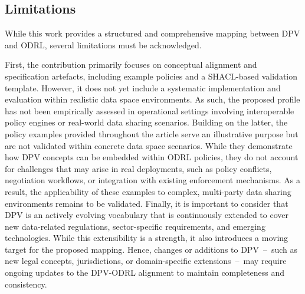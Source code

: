 \subsection{Limitations}
\label{sec:limitations}

While this work provides a structured and
comprehensive mapping between DPV and ODRL,
several limitations must be acknowledged.

First, the contribution primarily focuses on
conceptual alignment and specification artefacts,
including example policies and a SHACL-based validation template.
However,
it does not yet include a systematic implementation and evaluation
within realistic data space environments.
As such, the proposed profile has not been empirically assessed
in operational settings involving interoperable policy engines
or real-world data sharing scenarios.
Building on the latter,
the policy examples provided throughout the article
serve an illustrative purpose
but are not validated within concrete data space scenarios.
While they demonstrate how DPV concepts can be embedded within ODRL policies,
they do not account for challenges that may arise in real deployments,
such as policy conflicts, negotiation workflows,
or integration with existing enforcement mechanisms.
As a result,
the applicability of these examples to complex,
multi-party data sharing environments remains to be validated.
Finally,
it is important to consider that DPV is an actively evolving vocabulary
that is continuously extended to cover new data-related regulations,
sector-specific requirements, and emerging technologies.
While this extensibility is a strength,
it also introduces a moving target for the proposed mapping.
Hence,
changes or additions to DPV~--~such as
new legal concepts, jurisdictions, or domain-specific extensions~--~may
require ongoing updates to the DPV-ODRL alignment
to maintain completeness and consistency.